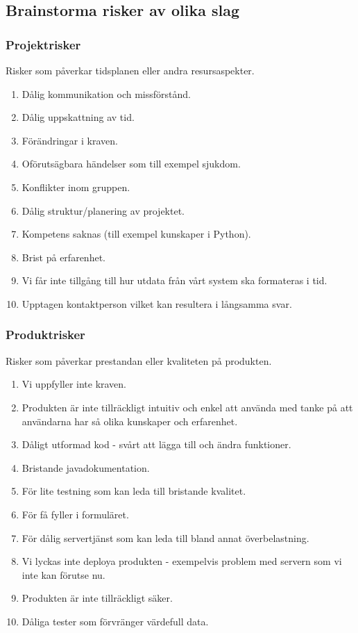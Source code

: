 \documentclass[12pt]{article}
\begin{document}
\subsection{Brainstorma risker av olika slag}
\subsubsection{Projektrisker}
Risker som påverkar tidsplanen eller andra resursaspekter. 
\begin{enumerate}
\item Dålig kommunikation och missförstånd.
\item Dålig uppskattning av tid.
\item Förändringar i kraven.
\item Oförutsägbara händelser som till exempel sjukdom.
\item Konflikter inom gruppen.
\item Dålig struktur/planering av projektet.
\item Kompetens saknas (till exempel kunskaper i Python).
\item Brist på erfarenhet.
\item Vi får inte tillgång till hur utdata från vårt system ska formateras i tid.
\item Upptagen kontaktperson vilket kan resultera i långsamma svar.
\end{enumerate}

\subsubsection{Produktrisker}
Risker som påverkar prestandan eller kvaliteten på produkten.
\begin{enumerate}
    \item Vi uppfyller inte kraven.
    \item Produkten är inte tillräckligt intuitiv och enkel att använda med tanke på att användarna har så olika kunskaper och erfarenhet.
    \item Dåligt utformad kod - svårt att lägga till och ändra funktioner.
    \item Bristande javadokumentation.
    \item För lite testning som kan leda till bristande kvalitet.
    \item För få fyller i formuläret.
    \item För dålig servertjänst som kan leda till bland annat överbelastning.
    \item Vi lyckas inte deploya produkten - exempelvis problem med servern som vi inte kan förutse nu.
    \item Produkten är inte tillräckligt säker.
    \item Dåliga tester som förvränger värdefull data.
\end{enumerate}
\end{document}
